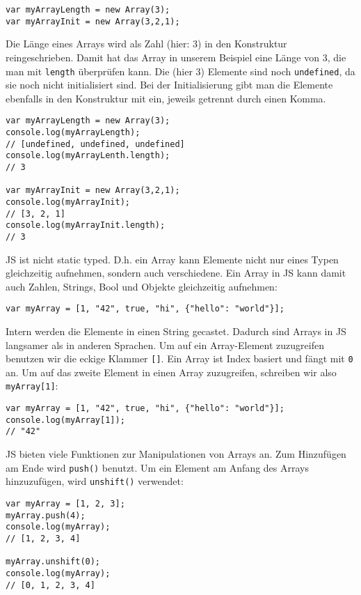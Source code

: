 \documentclass{book}
\begin{document}
\begin{lstlisting}[caption=Array Konstruktor]
var myArrayLength = new Array(3);
var myArrayInit = new Array(3,2,1);
\end{lstlisting}

Die Länge eines Arrays wird als Zahl (hier: 3) in den Konstruktur reingeschrieben. Damit hat das Array in unserem Beispiel eine Länge von 3, die man mit \lstinline|length| überprüfen kann. Die (hier 3) Elemente sind noch \lstinline|undefined|, da sie noch nicht initialisiert sind. Bei der Initialisierung gibt man die Elemente ebenfalls in den Konstruktur mit ein, jeweils getrennt durch einen Komma. 
\begin{lstlisting}[caption=Array Konstruktor]
var myArrayLength = new Array(3);
console.log(myArrayLength); 
// [undefined, undefined, undefined]
console.log(myArrayLenth.length); 
// 3

var myArrayInit = new Array(3,2,1);
console.log(myArrayInit); 
// [3, 2, 1]
console.log(myArrayInit.length); 
// 3
\end{lstlisting}

JS ist nicht static typed. D.h. ein Array kann Elemente nicht nur eines Typen gleichzeitig aufnehmen, sondern auch verschiedene. Ein Array in JS kann damit auch Zahlen, Strings, Bool und Objekte gleichzeitig aufnehmen:

\begin{lstlisting}[caption=Array Konstruktor]
var myArray = [1, "42", true, "hi", {"hello": "world"}];
\end{lstlisting}

Intern werden die Elemente in einen String gecastet. Dadurch sind Arrays in JS langsamer als in anderen Sprachen. Um auf ein Array-Element zuzugreifen benutzen wir die eckige Klammer \lstinline|[]|. Ein Array ist Index basiert und fängt mit \lstinline|0| an. Um auf das zweite Element in einen Array zuzugreifen, schreiben wir also \lstinline|myArray[1]|:

\begin{lstlisting}[caption=Array Konstruktor]
var myArray = [1, "42", true, "hi", {"hello": "world"}];
console.log(myArray[1]);
// "42"
\end{lstlisting}

JS bieten viele Funktionen zur Manipulationen von Arrays an.
Zum Hinzufügen am Ende wird \lstinline|push()| benutzt. Um ein Element am Anfang des Arrays hinzuzufügen, wird \lstinline|unshift()| verwendet:

\begin{lstlisting}[caption=Array Konstruktor]
var myArray = [1, 2, 3];
myArray.push(4);
console.log(myArray); 
// [1, 2, 3, 4]

myArray.unshift(0);
console.log(myArray); 
// [0, 1, 2, 3, 4]
\end{lstlisting}
\end{document}
